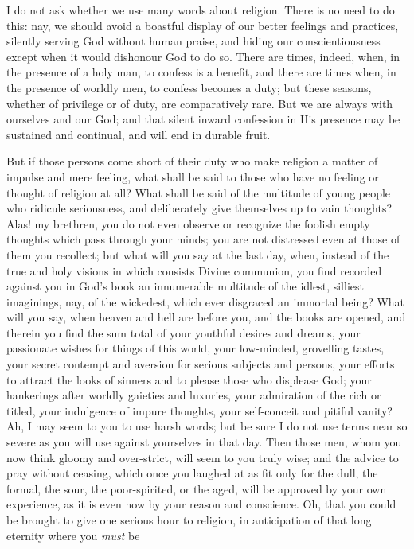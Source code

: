 I do not ask whether we use many words about religion. There is no
need to do this: nay, we should avoid a boastful display of our better
feelings and practices, silently serving God without human praise, and
hiding our conscientiousness except when it would dishonour God to do
so. There are times, indeed, when, in the presence of a holy man, to
confess is a benefit, and there are times when, in the presence of
worldly men, to confess becomes a duty; but these seasons, whether of
privilege or of duty, are comparatively rare. But we are always with
ourselves and our God; and that silent inward confession in His
presence may be sustained and continual, and will end in durable
fruit.

But if those persons come short of their duty who make religion a
matter of impulse and mere feeling, what shall be said to those who
have no feeling or thought of religion at all? What shall be said of
the multitude of young people who ridicule seriousness, and
deliberately give themselves up to vain thoughts? Alas! my brethren,
you do not even observe or recognize the foolish empty thoughts which
pass through your minds; you are not distressed even at those of them
you recollect; but what will you say at the last day, when, instead of
the true and holy visions in which consists Divine communion, you find
recorded against you in God's book an innumerable multitude of the
idlest, silliest imaginings, nay, of the wickedest, which ever
disgraced an immortal being? What will you say, when heaven and hell
are before you, and the books are opened, and therein you find the sum
total of your youthful desires and dreams, your passionate wishes for
things of this world, your low-minded, grovelling tastes, your secret
contempt and aversion for serious subjects and persons, your efforts
to attract the looks of sinners and to please those who displease God;
your hankerings after worldly gaieties and luxuries, your admiration
of the rich or titled, your indulgence of impure thoughts, your
self-conceit and pitiful vanity? Ah, I may seem to you to use harsh
words; but be sure I do not use terms near so severe as you will use
against yourselves in that day. Then those men, whom you now think
gloomy and over-strict, will seem to you truly wise; and the advice to
pray without ceasing, which once you laughed at as fit only for the
dull, the formal, the sour, the poor-spirited, or the aged, will be
approved by your own experience, as it is even now by your reason and
conscience. Oh, that you could be brought to give one serious hour to
religion, in anticipation of that long eternity where you \emph{must} be

